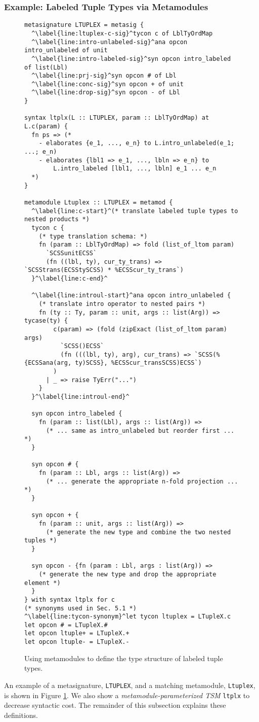 \subsubsection{Example: Labeled Tuple Types via Metamodules}
\begin{figure}[hp!]
\begin{lstlisting}
metasignature LTUPLEX = metasig {
  ^\label{line:ltuplex-c-sig}^tycon c of LblTyOrdMap
  ^\label{line:intro-unlabeled-sig}^ana opcon intro_unlabeled of unit
  ^\label{line:intro-labeled-sig}^syn opcon intro_labeled of list(Lbl)
  ^\label{line:prj-sig}^syn opcon # of Lbl
  ^\label{line:conc-sig}^syn opcon + of unit
  ^\label{line:drop-sig}^syn opcon - of Lbl
}

syntax ltplx(L :: LTUPLEX, param :: LblTyOrdMap) at L.c(param) {
  fn ps => (* 
    - elaborates {e_1, ..., e_n} to L.intro_unlabeled(e_1; ...; e_n)
    - elaborates {lbl1 => e_1, ..., lbln => e_n} to 
        L.intro_labeled [lbl1, ..., lbln] e_1 ... e_n
  *)
}

metamodule Ltuplex :: LTUPLEX = metamod {
  ^\label{line:c-start}^(* translate labeled tuple types to nested products *)
  tycon c {
  	(* type translation schema: *)
  	fn (param :: LblTyOrdMap) => fold (list_of_ltom param)
      `SCSSunitECSS`
      (fn ((lbl, ty), cur_ty_trans) => `SCSStrans(ECSStySCSS) * %ECSScur_ty_trans`)
  }^\label{line:c-end}^

  ^\label{line:introul-start}^ana opcon intro_unlabeled {
  	(* translate intro operator to nested pairs *)
  	fn (ty :: Ty, param :: unit, args :: list(Arg)) => tycase(ty) {
        c(param) => (fold (zipExact (list_of_ltom param) args)
      	  `SCSS()ECSS`
          (fn (((lbl, ty), arg), cur_trans) => `SCSS(%{ECSSana(arg, ty)SCSS}, %ECSScur_transSCSS)ECSS`)
        )
      | _ => raise TyErr("...")
    }
  }^\label{line:introul-end}^

  syn opcon intro_labeled {
  	fn (param :: list(Lbl), args :: list(Arg)) => 
      (* ... same as intro_unlabeled but reorder first ... *)
  } 

  syn opcon # {
  	fn (param :: Lbl, args :: list(Arg)) =>  
      (* ... generate the appropriate n-fold projection ... *)
  }

  syn opcon + {
  	fn (param :: unit, args :: list(Arg)) => 
      (* generate the new type and combine the two nested tuples *)
  }

  syn opcon - {fn (param : Lbl, args : list(Arg)) => 
    (* generate the new type and drop the appropriate element *)
  }
} with syntax ltplx for c 
(* synonyms used in Sec. 5.1 *)
^\label{line:tycon-synonym}^let tycon ltuplex = LTupleX.c
let opcon # = LTupleX.#
let opcon ltuple+ = LTupleX.+ 
let opcon ltuple- = LTupleX.-
\end{lstlisting}
\caption{Using metamodules to define the type structure of labeled tuple types.}
\label{fig:ltuplex}
\end{figure}
An example of a metasignature, \lstinline{LTUPLEX}, and a matching 
metamodule, \lstinline{Ltuplex}, is shown in Figure \ref{fig:ltuplex}. We also show a \emph{metamodule-parameterized TSM} \lstinline{ltplx} to decrease syntactic cost. The remainder of this subsection explains these definitions.

